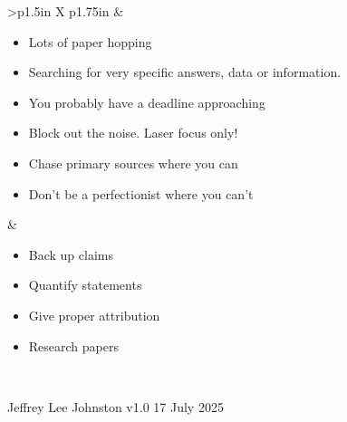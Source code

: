 \documentclass[8pt]{extarticle}
\begin{document}
\begin{tabularx}{\linewidth}{>{\bfseries}p{1.5in} X p{1.75in}}
            &   \begin{minipage}[t]{\linewidth}
                    \vspace{0pt}

                    \begin{whatBox}
                    \begin{itemize}[nosep,leftmargin=*]
                        \item Lots of paper hopping
                        \item Searching for very specific answers, data or information.
                    \end{itemize}
                    \end{whatBox}

                    \begin{tipsBox}
                    \begin{itemize}[nosep,leftmargin=*]
                        \item You probably have a deadline approaching
                        \item Block out the noise. Laser focus only!
                        \item Chase primary sources where you can
                        \item Don't be a perfectionist where you can't
                    \end{itemize}
                    \end{tipsBox}
                \end{minipage}

                    &   \begin{minipage}[t]{\linewidth}
                            \vspace{0pt}

                            \begin{whenBox}
                            \begin{itemize}[nosep,leftmargin=*]
                                \item Back up claims
                                \item Quantify statements
                                \item Give proper attribution
                            \end{itemize}
                            \end{whenBox}

                            \begin{sourcesBox}
                            \begin{itemize}[nosep,leftmargin=*]
                                \item Research papers
                            \end{itemize}
                            \end{sourcesBox}
                        \end{minipage}

                            \\
\end{tabularx}

\vspace{-1em}

\begin{flushright}
  \scriptsize Jeffrey Lee Johnston \textbar{} v1.0 \textbar{} 17 July 2025
\end{flushright}
\end{document}
